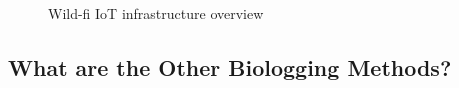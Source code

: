 \documentclass[sigplan,screen,nonacm]{acmart}
\begin{document}
\begin{figure}[htbp]
  \centering
  \caption{Wild-fi IoT infrastructure overview}
  \label{fig:wild-fi_IoT_diagram}
\end{figure}


\subsection{What are the Other Biologging Methods?}
\label{subsec:What are the Other Biologging Methods?}
\end{document}

